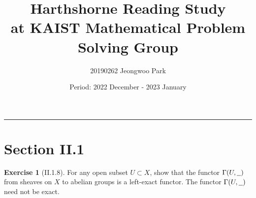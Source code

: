 \documentclass{article}
\title{\textbf{Harthshorne Reading Study}\\[0.5em] {\large at KAIST Mathematical Problem Solving Group}}
\author{20190262 Jeongwoo Park}
\date{Period: 2022 December - 2023 January}
\newcommand{\separater}{\begin{center} \rule{0.5\linewidth}{0.3pt} \end{center}}
\theoremstyle{plain}
\theoremstyle{definition}
\newtheorem*{exer}{Exercise}
\begin{document}
\maketitle

\separater

\section*{Section II.1}

\begin{exer}[II.1.8]
    For any open subset $U \subset X$, show that the functor $\Gamma(U, \underline{\hspace{0.6em}})$ from sheaves on $X$ to abelian groups is a left-exact functor. The functor $\Gamma(U, \underline{\hspace{0.6em}})$ need not be exact.
\end{exer}
\end{document}
